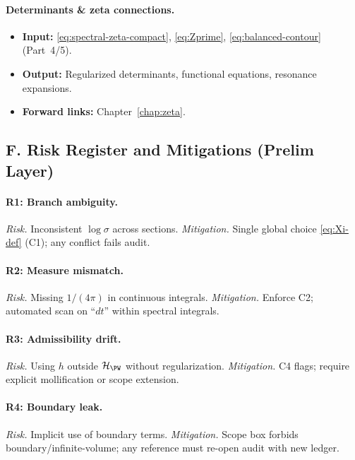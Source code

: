 \paragraph{Determinants \& zeta connections.}
\begin{itemize}
  \item \textbf{Input:} \eqref{eq:spectral-zeta-compact}, \eqref{eq:Zprime}, \eqref{eq:balanced-contour} (Part~4/5).
  \item \textbf{Output:} Regularized determinants, functional equations, resonance expansions.
  \item \textbf{Forward links:} Chapter~\ref{chap:zeta}.
\end{itemize}


\subsection*{F. Risk Register and Mitigations (Prelim Layer)}
\label{subsec:risks}

\paragraph{R1: Branch ambiguity.}
\emph{Risk.} Inconsistent $\log \sigma$ across sections. 
\emph{Mitigation.} Single global choice \eqref{eq:Xi-def} (C1); any conflict fails audit.

\paragraph{R2: Measure mismatch.}
\emph{Risk.} Missing $1/(4\pi)$ in continuous integrals. 
\emph{Mitigation.} Enforce C2; automated scan on “$dt$” within spectral integrals.

\paragraph{R3: Admissibility drift.}
\emph{Risk.} Using $h$ outside $\mathcal H_{\PW}$ without regularization. 
\emph{Mitigation.} C4 flags; require explicit mollification or scope extension.

\paragraph{R4: Boundary leak.}
\emph{Risk.} Implicit use of boundary terms. 
\emph{Mitigation.} Scope box forbids boundary/infinite-volume; any reference must re-open audit with new ledger.

